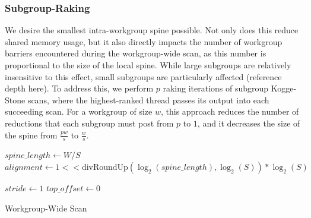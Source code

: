 \documentclass[sigconf]{acmart}
\begin{document}
\subsubsection{Subgroup-Raking}
We desire the smallest intra-workgroup spine possible. Not only does this reduce shared memory usage, but it also directly impacts the number of workgroup barriers encountered during the workgroup-wide scan, as this number is proportional to the size of the local spine. While large subgroups are relatively insensitive to this effect, small subgroups are particularly affected (reference depth here). To address this, we perform $p$ raking iterations of subgroup Kogge-Stone scans, where the highest-ranked thread passes its output into each succeeding scan. For a workgroup of size $w$, this approach reduces the number of reductions that each subgroup must post from $p$ to $1$, and it decreases the size of the spine from $\frac{pw}{s}$ to $\frac{w}{s}$.
\begin{algorithm}[htbp]
  \small
  \SetAlgoLined

  $spine\_length \gets W / S$\;
  $alignment \gets 1 << \text{divRoundUp}(\log_2(spine\_length), \log_2(S)) * \log_2(S)$\;

  $stride \gets 1$\;
  $top\_offset \gets 0$\;

  \;
  \caption{Workgroup-Wide Scan}
  \label{alg:example}
\end{algorithm}
\end{document}
